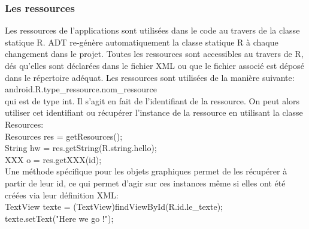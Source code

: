 \documentclass[a4paper]{report}
\begin{document}
			\subsubsection{Les ressources}
				Les ressources de l'applications sont utilisées dans le code au travers de la classe statique R. ADT re-génère automatiquement la classe statique R à chaque changement 				dans le projet. Toutes les ressources sont accessibles au travers de R, dés qu'elles sont déclarées dans le fichier XML ou que le fichier associé est déposé dans le 					répertoire adéquat. Les ressources sont utilisées de la manière suivante:\\

				android.R.type\_ressource.nom\_ressource\\

				qui est de type int. Il s'agit en fait de l'identifiant de la ressource. On peut alors utiliser cet identifiant ou récupérer l'instance de la ressource en utilisant la 				classe Resources:\\

				Resources res = getResources();\\
				String hw = res.getString(R.string.hello);\\
				XXX o = res.getXXX(id);\\

				Une méthode spécifique pour les objets graphiques permet de les récupérer à partir de leur id, ce qui permet d'agir sur ces instances même si elles ont été créées via 					leur définition XML:\\

				TextView texte = (TextView)findViewById(R.id.le\_texte);\\
				texte.setText("Here we go !");\\
\end{document}
